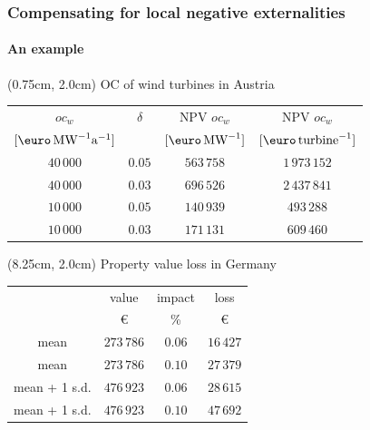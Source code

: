 \documentclass[aspectratio=169, xcolor=dvipsnames]{beamer}
\begin{document}
\begin{frame}
\frametitle{Compensating for local negative externalities}
\framesubtitle{An example}
\begin{textblock*}{7cm}(0.75cm, 2.0cm) %
OC of wind turbines in Austria
\vspace{-0.41cm}
\begin{table}
\begin{footnotesize}
	\begin{tabular}{c | c | c | c}
	$oc_w$ & $\delta$ & NPV $oc_w$ & NPV $oc_w$ \\
	$[\text{\euro}\, \text{MW}^{-1} \text{a}^{-1}]$ & & $[\text{\euro}\, \text{MW}^{-1}]$ & $[\text{\euro} \, \text{turbine}^{-1}]$ \\ \hline \hline
	$40\,000$ & $0.05$ & $563\,758$ & $1\,973\,152$ \\ \hline
	$40\,000$ & $0.03$ & $696\,526$ & $2\,437\,841$ \\ \hline
	$10\,000$ & $0.05$ & $140\,939$ & $493\,288$ \\ \hline
	$10\,000$ & $0.03$ & $171\,131$ & $609\,460$ \\ \hline
	\end{tabular}
\end{footnotesize}
\end{table}
\end{textblock*}

\begin{textblock*}{7cm}(8.25cm, 2.0cm) %
Property value loss in Germany
\begin{table}
\begin{footnotesize}
	\begin{tabular}{c | c | c | c}
	  & value & impact & loss \\
	  & \euro & \% & \euro \\ \hline \hline
	mean & $273\,786$ & $0.06$ & $16\,427$ \\ \hline
	mean & $273\,786$ & $0.10$ & $27\,379$ \\ \hline
	mean + 1 s.d. & $476\,923$ & $0.06$ & $28\,615$ \\ \hline
	mean + 1 s.d. & $476\,923$ & $0.10$ & $47\,692$ \\ \hline
	\end{tabular}
\end{footnotesize}
\end{table}
\end{textblock*}


\end{frame}
\end{document}
